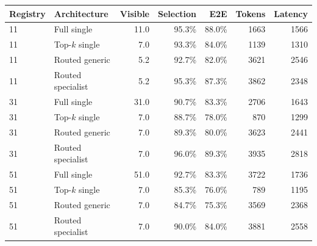 \begin{tabular}{llrrrrr}
\toprule
Registry & Architecture & Visible & Selection & E2E & Tokens & Latency \\
\midrule
11 & Full single & 11.0 & 95.3\% & 88.0\% & 1663 & 1566 \\
11 & Top-$k$ single & 7.0 & 93.3\% & 84.0\% & 1139 & 1310 \\
11 & Routed generic & 5.2 & 92.7\% & 82.0\% & 3621 & 2546 \\
11 & Routed specialist & 5.2 & 95.3\% & 87.3\% & 3862 & 2348 \\
\midrule
31 & Full single & 31.0 & 90.7\% & 83.3\% & 2706 & 1643 \\
31 & Top-$k$ single & 7.0 & 88.7\% & 78.0\% & 870 & 1299 \\
31 & Routed generic & 7.0 & 89.3\% & 80.0\% & 3623 & 2441 \\
31 & Routed specialist & 7.0 & 96.0\% & 89.3\% & 3935 & 2818 \\
\midrule
51 & Full single & 51.0 & 92.7\% & 83.3\% & 3722 & 1736 \\
51 & Top-$k$ single & 7.0 & 85.3\% & 76.0\% & 789 & 1195 \\
51 & Routed generic & 7.0 & 84.7\% & 75.3\% & 3569 & 2368 \\
51 & Routed specialist & 7.0 & 90.0\% & 84.0\% & 3881 & 2558 \\
\bottomrule
\end{tabular}
